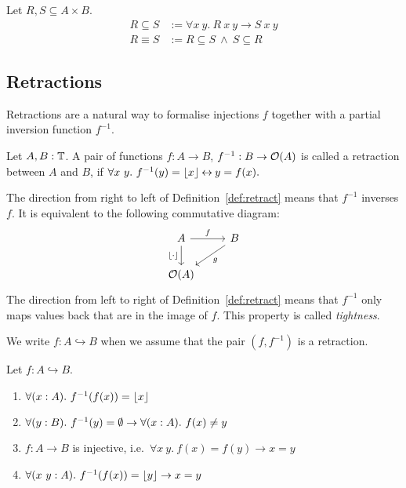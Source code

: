 \begin{definition}
  Let $R,S \subseteq A \times B$.
  \begin{align*}
    R \subseteq S &:= \forall x~y.~R~x~y \rightarrow S~x~y \\
    R \equiv S    &:= R \subseteq S ~\land~ S \subseteq R
  \end{align*}
\end{definition}


\subsection{Retractions}
\label{sec:retracts}

Retractions are a natural way to formalise injections $f$ together with a partial inversion function $f^{-1}$.

\begin{definition}[Retraction]
  \label{def:retract}
  Let $A, B : \mathbb{T}$.  A pair of functions $f : A \to B$, $f^{-1} : B \rightarrow \mathcal{O}(A)$ is called a retraction between $A$ and $B$, if
  $ \forall x~y.~f^{-1}(y) = \left\lfloor {x} \right\rfloor \mathbin{\leftrightarrow} y = f(x). $
\end{definition}

The direction from right to left of Definition~\ref{def:retract} means that $f^{-1}$ inverses $f$.  It is equivalent to the following commutative
diagram:
\[
  \begin{tikzcd}
    A \arrow[r, "f"] \arrow[d, "\Some \cdot", swap] & B \arrow[ld, "g"] \\
    \Option(A) &
  \end{tikzcd}
\]
The direction from left to right of Definition~\ref{def:retract} means that $f^{-1}$ only maps values back that are in the image of $f$.  This
property is called \emph{tightness}.

We write $f : A \hookrightarrow B$ when we assume that the pair $(f, f^{-1})$ is a retraction.


\begin{lemma}
  \label{lem:retracts-basic}
  Let $f : A \hookrightarrow B$.
  \begin{enumerate}
  \item \label{lem:retract_g_adjoint}
    $\forall (x:A).~f^{-1}(f(x)) = \left\lfloor {x} \right\rfloor$
  \item \label{lem:retract_g_None}
    $\forall (y:B).~f^{-1}(y) = \emptyset \rightarrow \forall (x:A).~f(x) \neq y$
  \item \label{lem:retract_f_injective}
    $f : A \to B$ is injective, i.e.\ $\forall x~y.~f(x)=f(y) \rightarrow x=y$
  \item \label{lem:retract_g_Some}
    $\forall (x~y:A).~f^{-1}(f(x)) = \left\lfloor {y} \right\rfloor \rightarrow x=y$
  \end{enumerate}
\end{lemma}

